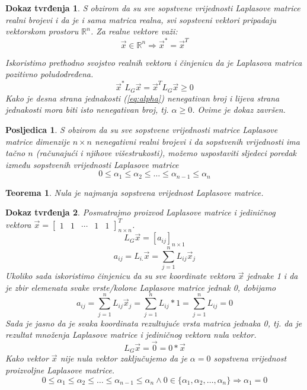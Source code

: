\documentclass[11pt]{article}
\newtheorem{theorem}{Teorema}
\newtheorem*{custom_proof}{Dokaz tvrđenja}
\newtheorem{consequence}{Posljedica}
\begin{document}
\begin{custom_proof}
	S obzirom da su sve sopstvene vrijednosti Laplasove matrice realni brojevi i da je i sama matrica realna, svi sopstveni vektori pripadaju vektorskom prostoru $\mathbb{R}^n$. 
	Za realne vektore važi:
	\[
		\vec{x} \in \mathbb{R}^n \Rightarrow \vec{x}^* = \vec{x}^T
	\]

	Iskoristimo prethodno svojstvo realnih vektora i činjenicu da je Laplasova matrica pozitivno poludodređena.
	\[
		\vec{x}^* L_G \vec{x} = \vec{x}^T L_G \vec{x} \geq 0
	\]
	Kako je desna strana jednakosti (\ref{eq:alpha}) nenegativan broj i lijeva strana jednakosti mora biti isto nenegativan  broj, tj. $\alpha \geq 0$. Ovime je dokaz završen. 
	\end{custom_proof}
	
	\begin{consequence}
	S obzirom da su sve sopstvene vrijednosti matrice Laplasove matrice dimenzije $n \times n$ nenegativni realni brojevi i da sopstvenih vrijednosti ima tačno $n$
	(računajući i njihove višestrukosti), možemo uspostaviti sljedeci poredak između sopstvenih vrijednosti Laplasove matrice 
	\[
	0 \leq \alpha_1 \leq \alpha_2 \leq \dots \leq \alpha_{n-1} \leq \alpha_n
	\]
	\end{consequence}
	
	\begin{theorem} Nula je najmanja sopstvena vrijednost Laplasove matrice.
	\end{theorem}
	
	\begin{custom_proof}
	Posmatrajmo proizvod Laplasove matrice i jediničnog vektora $\vec{x}=\begin{bmatrix} 1 & 1 & \cdots & 1 & 1  \end{bmatrix}^T_{n \times n}$.
	\[
	L_G\vec{x} = [a_{ij}]_{n \times 1}
	\]
	\[
		a_{ij} = L_{i.}\vec{x} = \sum_{j=1}^{n}L_{ij} \vec{x}_j 
	\]
	Ukoliko sada iskoristimo činjenicu da su sve koordinate vektora $\vec{x}$ jednake 1 i da je zbir elemenata svake vrste/kolone Laplasove matrice jednak 0, dobijamo
	\[
		a_{ij} = \sum_{j=1}^{n}L_{ij} \vec{x}_j = \sum_{j=1}^{n}L_{ij} * 1 = \sum_{j=1}^{n}L_{ij} = 0
	\]
	Sada je jasno da je svaka koordinata rezultujuće vrsta matrica jednaka 0, tj. da je rezultat množenja Laplasove matrice i jediničnog vektora nula vektor.
	\[
	L_G\vec{x} = \vec{0} = 0 * \vec{x}
	\]
	Kako vektor $\vec{x}$ nije nula vektor zaključujemo da je $\alpha = 0$ sopstvena vrijednost proizvoljne Laplasove matrice.
	\[
		0 \leq \alpha_1 \leq \alpha_2 \leq \dots \leq \alpha_{n-1} \leq \alpha_n \land 0 \in \{\alpha_1, \alpha_2, \dots, \alpha_n\} \Rightarrow \alpha_1 = 0
	\]
	\end{custom_proof}
	
\end{document}
